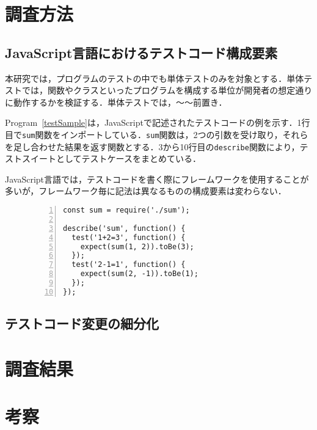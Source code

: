 \documentclass[11pt,dvipdfmx]{jreport}
\begin{document}
\section{調査方法}
\subsection{JavaScript言語におけるテストコード構成要素}
本研究では，プログラムのテストの中でも単体テストのみを対象とする．単体テストでは，関数やクラスといったプログラムを構成する単位が開発者の想定通りに動作するかを検証する．単体テストでは，〜〜前置き．

Program~\ref{testSample}は，JavaScriptで記述されたテストコードの例を示す．1行目で{\verb|sum|}関数をインポートしている．{\verb|sum|}関数は，2つの引数を受け取り，それらを足し合わせた結果を返す関数とする．3から10行目の{\verb|describe|}関数により，テストスイートとしてテストケースをまとめている．

JavaScript言語では，テストコードを書く際にフレームワークを使用することが多いが，フレームワーク毎に記法は異なるものの構成要素は変わらない．

\begin{figure}[t]
  \begin{lstlisting}[caption={[upper/lower text]%
             \begin{tabular}[t]{@{}l@{}}
              test/sum.test.js \\[1.0\normalbaselineskip]
             \end{tabular}},frame={tb},numbers=left,label=testSample,identifierstyle={\small}]
const sum = require('./sum');

describe('sum', function() {
  test('1+2=3', function() {
    expect(sum(1, 2)).toBe(3);
  });
  test('2-1=1', function() {
    expect(sum(2, -1)).toBe(1);
  });
});
\end{lstlisting}
\vspace{-6mm}
\end{figure}
\subsection{テストコード変更の細分化}


\section{調査結果}


\section{考察}
\end{document}
